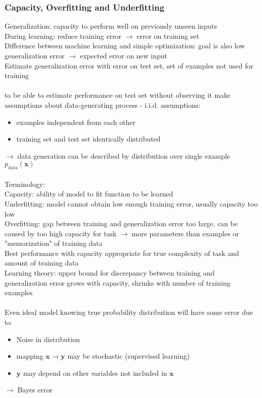 \documentclass{article}
\newcommand{\arrow}{$\rightarrow\;$}
\renewcommand{\v}{\bm}
\newcommand{\p}[1]{p_\text{#1}}
\begin{document}
\subsubsection*{Capacity, Overfitting and Underfitting}
Generalization: capacity to perform well on previously unseen inputs \\
During learning: reduce training error \arrow error on training set \\
Difference between machine learning and simple optimization:
goal is also low generalization error \arrow expected error on new input \\
Estimate generalization error with error on test set, set of examples not used for training \\
\\
to be able to estimate performance on test set without observing it make assumptions about data-generating process - i.i.d. assumptions:
\begin{itemize}
    \item examples independent from each other
    \item training set and test set identically distributed
\end{itemize}
\arrow data generation can be described by distribution over single example $\p{data}(\v{x})$ \\
\\
Terminology:\\
Capacity: ability of model to fit function to be learned \\
Underfitting: model cannot obtain low enough training error, usually capacity too low \\
Overfitting: gap between training and generalization error too large, can be caused by too high capacity for task
\arrow more parameters than examples or "memorization" of training data \\
Best performance with capacity appropriate for true complexity of task and amount of training data \\
Learning theory: upper bound for discrepancy between training and generalization error grows with capacity, shrinks with number of training examples \\
\\
Even ideal model knowing true probability distribution will have some error due to
\begin{itemize}
    \item Noise in distribution
    \item mapping $\v{x} \rightarrow \v{y}$ may be stochastic (supervised learning)
    \item $\v{y}$ may depend on other variables not included in $\v{x}$
\end{itemize}
\arrow Bayes error
\end{document}
